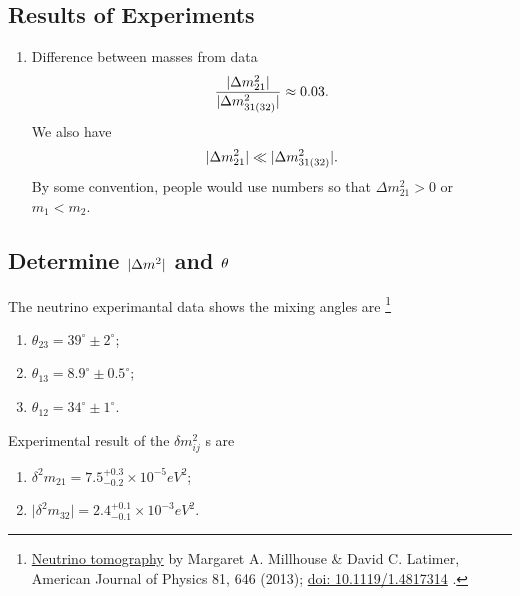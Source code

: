 \documentclass[letterpaper,12pt,english]{sphinxmanual}
\begin{document}
\subsection{Results of Experiments}
\label{oscillations:results-of-experiments}\begin{enumerate}
\item {} 
Difference between masses from data
\begin{gather}
\begin{split}\frac{\lvert \Delta m_{21}^2 \rvert}{\lvert \Delta m_{31(32)}^2 \rvert} \approx 0.03 .\end{split}\notag
\end{gather}
We also have
\begin{gather}
\begin{split}\lvert\Delta m_{21}^2 \rvert \ll \lvert \Delta m_{31(32)}^2 \rvert.\end{split}\notag
\end{gather}
By some convention, people would use numbers so that \(\Delta m_{21}^2 > 0\) or \(m_1 < m_2\).

\end{enumerate}


\subsection{Determine \protect\(\vert\Delta m^2\vert\protect\) and \protect\(\theta\protect\)}
\label{oscillations:determine-and}
The neutrino experimantal data shows the mixing angles are \footnote[1]{
\href{http://scitation.aip.org/docserver/fulltext/aapt/journal/ajp/81/9/1.4817314.pdf?expires=1404757170\&id=id\&accname=389573\&checksum=665C4B4FC4EA96902216439ECF5AC17D}{Neutrino tomography} by Margaret A. Millhouse \& David C. Latimer, American Journal of Physics 81, 646 (2013); \href{http://dx.doi.org/10.1119/1.4817314}{doi: 10.1119/1.4817314} .
}
\begin{enumerate}
\item {} 
\(\theta_{23}=39^{\circ}\pm 2 ^{\circ}\);

\item {} 
\(\theta_{13}=8.9^{\circ}\pm 0.5^{\circ}\);

\item {} 
\(\theta_{12}=34^{\circ}\pm 1^{\circ}\).

\end{enumerate}

Experimental result of the \(\delta m^2 _{ij}\) s are \footnotemark[1]
\begin{enumerate}
\item {} 
\(\delta^2 m_{21}=7.5^{+0.3}_{-0.2}\times 10^{-5}eV^2\);

\item {} 
\(\lvert\delta^2 m_{32}\rvert =2.4^{+0.1}_{-0.1}\times 10^{-3}eV^2\).

\end{enumerate}
\end{document}
